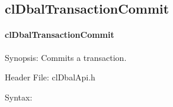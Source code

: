 \begin{flushleft}
\subsection{clDbalTransactionCommit}
\hypertarget{pagedbal112}{}\paragraph{cl\-Dbal\-Transaction\-Commit}\label{pagedbal112}
\begin{Desc}
\item[Synopsis:]Commits a transaction.\end{Desc}
\begin{Desc}
\item[Header File:]clDbalApi.h\end{Desc}
\begin{Desc}
\item[Syntax:]


\end{Desc}
\end{flushleft}
